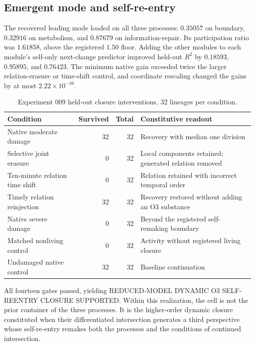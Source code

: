 \documentclass[11pt,a4paper]{article}
\begin{document}
\subsection{Emergent mode and self-re-entry}

The recovered leading mode loaded on all three processes: $0.35057$ on boundary, $0.32916$ on metabolism, and $0.87679$ on information-repair. Its participation ratio was $1.61858$, above the registered $1.50$ floor. Adding the other modules to each module's self-only next-change predictor improved held-out $R^2$ by $0.18593$, $0.95895$, and $0.76423$. The minimum native gain exceeded twice the larger relation-erasure or time-shift control, and coordinate rescaling changed the gains by at most $2.22\times10^{-16}$.

\begin{table}[H]
\centering
\footnotesize
\caption{Experiment 009 held-out closure interventions, 32 lineages per condition.}
\begin{tabularx}{\textwidth}{@{}>{\raggedright\arraybackslash}Xrr>{\raggedright\arraybackslash}p{5.0cm}@{}}
\toprule
Condition & Survived & Total & Constitutive readout \\
\midrule
Native moderate damage & 32 & 32 & Recovery with median one division \\
Selective joint erasure & 0 & 32 & Local components retained; generated relation removed \\
Ten-minute relation time shift & 0 & 32 & Relation retained with incorrect temporal order \\
Timely relation reinjection & 32 & 32 & Recovery restored without adding an O3 substance \\
Native severe damage & 0 & 32 & Beyond the registered self-remaking boundary \\
Matched nonliving control & 0 & 32 & Activity without registered living closure \\
Undamaged native control & 32 & 32 & Baseline continuation \\
\bottomrule
\end{tabularx}
\end{table}

All fourteen gates passed, yielding \textsf{REDUCED-MODEL DYNAMIC O3 SELF-REENTRY CLOSURE SUPPORTED}. Within this realization, the cell is not the prior container of the three processes. It is the higher-order dynamic closure constituted when their differentiated intersection generates a third perspective whose self-re-entry remakes both the processes and the conditions of continued intersection.
\end{document}
